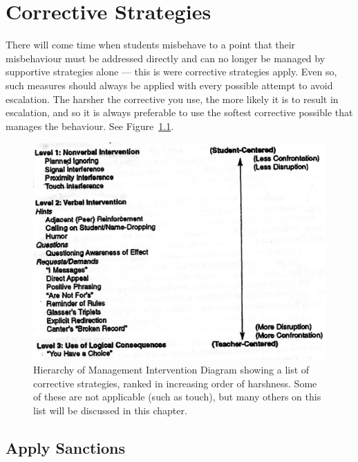 \documentclass[12pt]{report}
\begin{document}
\chapter{Corrective Strategies}
\label{chap:corrective}

There will come time when students misbehave to a point that their misbehaviour must be addressed directly and can no longer be managed by supportive strategies alone --- this is were corrective strategies apply. Even so, such measures should always be applied with every possible attempt to avoid escalation. The harsher the corrective you use, the more likely it is to result in escalation, and so it is always preferable to use the softest corrective possible that manages the behaviour. See Figure~\ref{fig:correctiveHierarchy}.

\begin{figure}[h]
\begin{center}
\includegraphics{./images/correctiveHierarchy.jpg}
\end{center}
\caption{Hierarchy of Management Intervention Diagram \cite{Levin2005} showing a list of corrective strategies, ranked in increasing order of harshness. Some of these are not applicable (such as touch), but many others on this list will be discussed in this chapter. \label{fig:correctiveHierarchy}}
\end{figure}


\section{Apply Sanctions}
\label{sec:sanctions_c}
\end{document}
